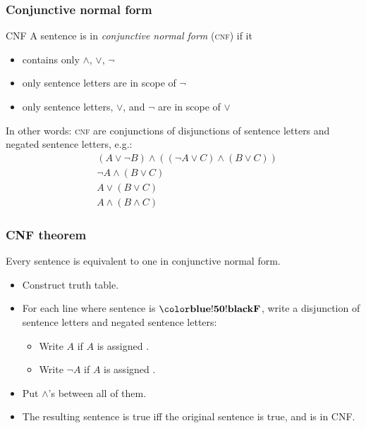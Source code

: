 \begin{frame}
  \frametitle{Conjunctive normal form}

  \begin{block}{CNF}
    A sentence is in \emph{conjunctive normal form} (\textsc{cnf}) if it
    \begin{itemize}
      \item contains only $\land$, $\lor$, $\lnot$
      \item only sentence letters are in scope of $\lnot$
      \item only sentence letters, $\lor$, and $\lnot$ are in scope of $\lor$
    \end{itemize}
  \end{block}

  In other words: \textsc{cnf} are conjunctions of disjunctions of
  sentence letters and negated sentence letters, e.g.:
  \begin{align*}
  & (A \lor \lnot B) \land ((\lnot A \lor C) \land (B \lor C))\\
  & \lnot A \land (B \lor C)\\
  & A \lor (B \lor C) \\
  & A \land (B \land C)
  \end{align*}

\end{frame}

\begin{frame}
\frametitle{CNF theorem}

\begin{theorem}
Every sentence is equivalent to one in conjunctive normal form.
\end{theorem}

\begin{itemize}
  \item Construct truth table.
  \item For each line where sentence is $\False$, write a disjunction
  of sentence letters and negated sentence letters:
  \begin{itemize}
    \item Write $A$ if $A$ is assigned \False.
    \item Write $\lnot A$ if $A$ is assigned \True.
  \end{itemize}
  \item Put $\land$'s between all of them.
  \item The resulting sentence is true iff the original sentence is true, and is in CNF.
\end{itemize}

\end{frame}

